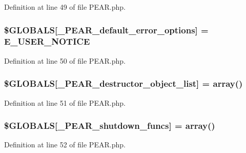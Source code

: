Definition at line 49 of file P\+E\+A\+R.\+php.

\hypertarget{PEAR_8php_a9a627cdd7a06f69e65a763b541b3540c}{}
\subsubsection[{\$\+G\+L\+O\+B\+A\+L\+S}]{\setlength{\rightskip}{0pt plus 5cm}\$G\+L\+O\+B\+A\+L\+S\mbox{[}\textquotesingle{}\+\_\+\+P\+E\+A\+R\+\_\+default\+\_\+error\+\_\+options\textquotesingle{}\mbox{]} = E\+\_\+\+U\+S\+E\+R\+\_\+\+N\+O\+T\+I\+C\+E}\label{PEAR_8php_a9a627cdd7a06f69e65a763b541b3540c}


Definition at line 50 of file P\+E\+A\+R.\+php.

\hypertarget{PEAR_8php_a46e1d062e4e9379133e4b4806e9f4cdd}{}
\subsubsection[{\$\+G\+L\+O\+B\+A\+L\+S}]{\setlength{\rightskip}{0pt plus 5cm}\$G\+L\+O\+B\+A\+L\+S\mbox{[}\textquotesingle{}\+\_\+\+P\+E\+A\+R\+\_\+destructor\+\_\+object\+\_\+list\textquotesingle{}\mbox{]} = array()}\label{PEAR_8php_a46e1d062e4e9379133e4b4806e9f4cdd}


Definition at line 51 of file P\+E\+A\+R.\+php.

\hypertarget{PEAR_8php_a1e8a8915e879323948ae30d5217c515c}{}
\subsubsection[{\$\+G\+L\+O\+B\+A\+L\+S}]{\setlength{\rightskip}{0pt plus 5cm}\$G\+L\+O\+B\+A\+L\+S\mbox{[}\textquotesingle{}\+\_\+\+P\+E\+A\+R\+\_\+shutdown\+\_\+funcs\textquotesingle{}\mbox{]} = array()}\label{PEAR_8php_a1e8a8915e879323948ae30d5217c515c}


Definition at line 52 of file P\+E\+A\+R.\+php.

\hypertarget{PEAR_8php_ae888e544d830e6c8570cd51fd614de27}{}
